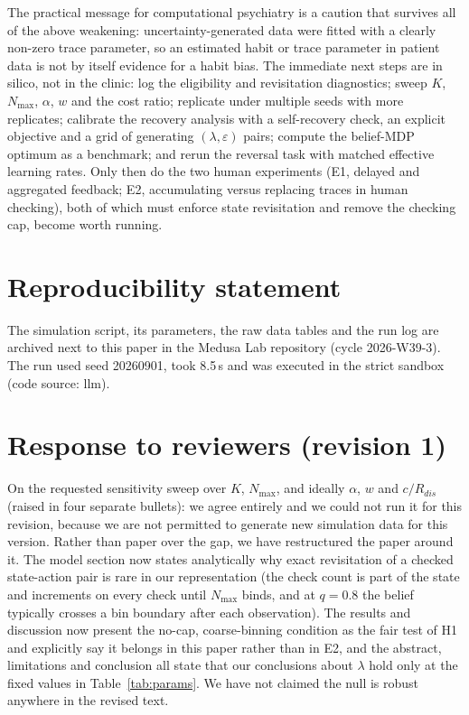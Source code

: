 \documentclass[11pt,a4paper]{article}
\begin{document}
The practical message for computational psychiatry is a caution that survives all of the above weakening: uncertainty-generated data were fitted with a clearly non-zero trace parameter, so an estimated habit or trace parameter in patient data is not by itself evidence for a habit bias. The immediate next steps are in silico, not in the clinic: log the eligibility and revisitation diagnostics; sweep $K$, $N_{\max}$, $\alpha$, $w$ and the cost ratio; replicate under multiple seeds with more replicates; calibrate the recovery analysis with a self-recovery check, an explicit objective and a grid of generating $(\lambda, \varepsilon)$ pairs; compute the belief-MDP optimum as a benchmark; and rerun the reversal task with matched effective learning rates. Only then do the two human experiments (E1, delayed and aggregated feedback; E2, accumulating versus replacing traces in human checking), both of which must enforce state revisitation and remove the checking cap, become worth running.

\section*{Reproducibility statement}
The simulation script, its parameters, the raw data tables and the run log are archived next to this paper in the
Medusa Lab repository (cycle 2026-W39-3). The run used seed 20260901, took 8.5\,s and was
executed in the strict sandbox (code source: llm).

\appendix
\section{Response to reviewers (revision 1)}
On the requested sensitivity sweep over $K$, $N_{\max}$, and ideally $\alpha$, $w$ and $c/R_{dis}$ (raised in four separate bullets): we agree entirely and we could not run it for this revision, because we are not permitted to generate new simulation data for this version. Rather than paper over the gap, we have restructured the paper around it. The model section now states analytically why exact revisitation of a checked state-action pair is rare in our representation (the check count is part of the state and increments on every check until $N_{\max}$ binds, and at $q=0.8$ the belief typically crosses a bin boundary after each observation). The results and discussion now present the no-cap, coarse-binning condition as the fair test of H1 and explicitly say it belongs in this paper rather than in E2, and the abstract, limitations and conclusion all state that our conclusions about $\lambda$ hold only at the fixed values in Table~\ref{tab:params}. We have not claimed the null is robust anywhere in the revised text.
\end{document}
